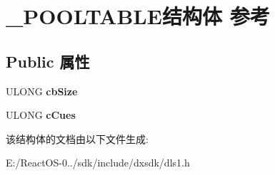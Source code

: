 \hypertarget{struct___p_o_o_l_t_a_b_l_e}{}\section{\+\_\+\+P\+O\+O\+L\+T\+A\+B\+L\+E结构体 参考}
\label{struct___p_o_o_l_t_a_b_l_e}
\subsection*{Public 属性}
\begin{DoxyCompactItemize}
\item 
\mbox{\label{struct___p_o_o_l_t_a_b_l_e_a512ff057b626d2597ee75a66b9ebcadd}} 
U\+L\+O\+NG {\bfseries cb\+Size}
\item 
\mbox{\label{struct___p_o_o_l_t_a_b_l_e_af617e9eec94eca9da50481c4046f9cac}} 
U\+L\+O\+NG {\bfseries c\+Cues}
\end{DoxyCompactItemize}


该结构体的文档由以下文件生成\+:\begin{DoxyCompactItemize}
\item 
E\+:/\+React\+O\+S-\/0../sdk/include/dxsdk/dls1.\+h\end{DoxyCompactItemize}
